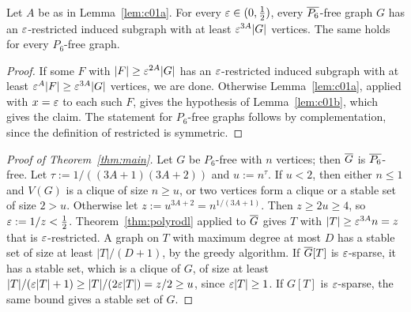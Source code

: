 \begin{theorem}\label{thm:polyrodl}
Let $A$ be as in Lemma~\ref{lem:c01a}. For every $\varepsilon\in(0,\frac12)$, every $\overline{P_6}$-free graph $G$ has an
$\varepsilon$-restricted induced subgraph with at least $\varepsilon^{3A}|G|$ vertices. The same holds for every $P_6$-free
graph.
\end{theorem}
\begin{proof}
If some $F$ with $|F|\ge\varepsilon^{2A}|G|$ has an $\varepsilon$-restricted induced subgraph with at least $\varepsilon^A|F|\ge
\varepsilon^{3A}|G|$ vertices, we are done. Otherwise Lemma~\ref{lem:c01a}, applied with $x=\varepsilon$ to each such $F$,
gives the hypothesis of Lemma~\ref{lem:c01b}, which gives the claim. The statement for $P_6$-free graphs
follows by complementation, since the definition of restricted is symmetric.
\end{proof}

\begin{proof}[Proof of Theorem~\ref{thm:main}]
Let $G$ be $P_6$-free with $n$ vertices; then $\overline{G}$ is $\overline{P_6}$-free. Let $\tau:=1/((3A+1)(3A+2))$ and
$u:=n^\tau$. If $u<2$, then either $n\le1$ and $V(G)$ is a clique of size $n\ge u$, or two vertices form a
clique or a stable set of size $2>u$. Otherwise let $z:=u^{3A+2}=n^{1/(3A+1)}$. Then $z\ge2u\ge4$, so
$\varepsilon:=1/z<\frac12$. Theorem~\ref{thm:polyrodl} applied to $\overline{G}$ gives $T$ with $|T|\ge\varepsilon^{3A}n=z$ that is
$\varepsilon$-restricted. A graph on $T$ with maximum degree at most $D$ has a stable set of size at least
$|T|/(D+1)$, by the greedy algorithm. If $\overline{G}[T]$ is $\varepsilon$-sparse, it has a stable set, which is a clique
of $G$, of size at least $|T|/(\varepsilon|T|+1)\ge|T|/(2\varepsilon|T|)=z/2\ge u$, since $\varepsilon|T|\ge1$. If $G[T]$ is
$\varepsilon$-sparse, the same bound gives a stable set of $G$.
\end{proof}
